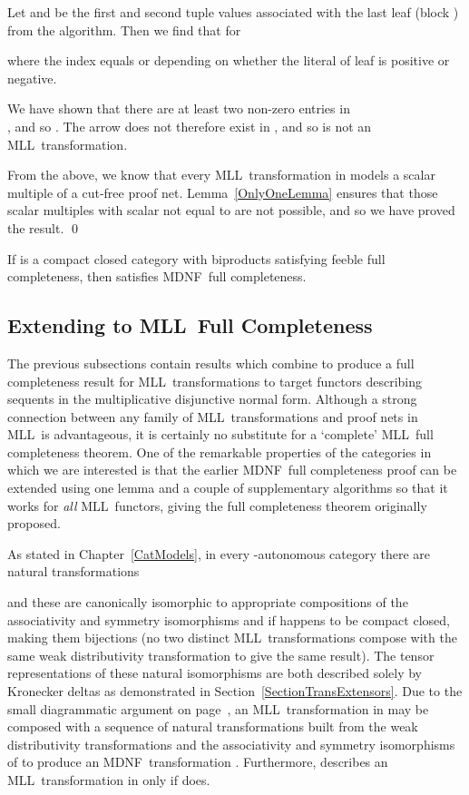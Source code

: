 \documentclass{LMCS}
\theoremstyle{plain}\newtheorem*{cLm}{Claim}
\newcommand{\mll}{MLL} \newcommand{\mall}{MALL}
\newcommand{\p}{} \newcommand{\N}{\mathbb{N}}
\begin{document}
    Let  and 
be the first and second tuple values associated with the last leaf
    (block ) from the algorithm. Then we find that for 
    
    where the index  equals  or 
    depending on whether the literal of leaf  is positive or
    negative.
    
    \p We have shown that there are at least two non-zero entries in \\
    , and so . The arrow
     does not
    therefore exist in
    , and so  is
    not an \mll\ transformation.
  
    \p From the above, we know that every \mll\ transformation in 
    models a scalar multiple of a cut-free proof net. Lemma~\ref{OnlyOneLemma} ensures that those scalar multiples with scalar not equal to  are not possible, and so we have proved the result. \qed
    
    \begin{thm} \label{MDNFFC} If\/  is a compact closed category
      with biproducts satisfying feeble full completeness, then 
      satisfies MDNF~full completeness.
    \end{thm}
    
    \subsection{Extending to \mll~Full Completeness} \label{SectionMLLExtend}
    
    The previous subsections contain results which combine to produce a full completeness result for \mll~transformations to target functors describing sequents in the multiplicative disjunctive normal form. Although a strong connection between any family of \mll~transformations and proof nets in \mll\ is advantageous, it is certainly no substitute for a `complete' \mll~full completeness theorem. One of the remarkable properties of the categories in which we are interested is that the earlier MDNF~full completeness proof can be extended using one lemma and a couple of supplementary algorithms so that it works for \emph{all} \mll~functors, giving the full completeness theorem originally proposed.
    
    \p As stated in Chapter~\ref{CatModels}, in every -autonomous category  there are natural
    transformations
    
    and these are canonically isomorphic to appropriate compositions of the associativity and symmetry isomorphisms  and  if  happens to be compact closed, making them bijections (no two distinct \mll~transformations compose with the same weak distributivity transformation to give the same result). The tensor representations of these natural isomorphisms are both described solely by Kronecker deltas as demonstrated in Section~\ref{SectionTransExtensors}. Due to the small diagrammatic argument on page~\pageref{DiNatsComposeStatement}, an \mll~transformation  in  may be composed with a sequence of natural transformations built from the weak distributivity transformations and the associativity and symmetry isomorphisms of  to
    produce an MDNF~transformation . Furthermore,  describes an \mll~transformation in  only if  does.
    
\end{document}
